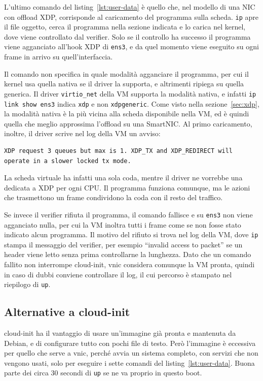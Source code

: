 L'ultimo comando del listing~\ref{lst:user-data} è quello che, nel modello di una NIC con offload XDP, corrisponde al caricamento del programma sulla scheda. \texttt{ip} apre il file oggetto, cerca il programma nella sezione indicata e lo carica nel kernel, dove viene controllato dal verifier. Solo se il controllo ha successo il programma viene agganciato all'hook XDP di \texttt{ens3}, e da quel momento viene eseguito su ogni frame in arrivo su quell'interfaccia.

Il comando non specifica in quale modalità agganciare il programma, per cui il kernel usa quella nativa se il driver la supporta, e altrimenti ripiega su quella generica. Il driver \texttt{virtio\_net} della VM supporta la modalità nativa, e infatti \texttt{ip link show ens3} indica \texttt{xdp} e non \texttt{xdpgeneric}. Come visto nella sezione~\ref{sec:xdp}, la modalità nativa è la più vicina alla scheda disponibile nella VM, ed è quindi quella che meglio approssima l'offload su una SmartNIC. Al primo caricamento, inoltre, il driver scrive nel log della VM un avviso:
\begin{lstlisting}[numbers=none, basicstyle=\ttfamily\scriptsize]
XDP request 3 queues but max is 1. XDP_TX and XDP_REDIRECT will operate in a slower locked tx mode.
\end{lstlisting}
La scheda virtuale ha infatti una sola coda, mentre il driver ne vorrebbe una dedicata a XDP per ogni CPU. Il programma funziona comunque, ma le azioni che trasmettono un frame condividono la coda con il resto del traffico.

Se invece il verifier rifiuta il programma, il comando fallisce e su \texttt{ens3} non viene agganciato nulla, per cui la VM inoltra tutti i frame come se non fosse stato indicato alcun programma. Il motivo del rifiuto si trova nel log della VM, dove \texttt{ip} stampa il messaggio del verifier, per esempio ``invalid access to packet'' se un header viene letto senza prima controllarne la lunghezza.
Dato che un comando fallito non interrompe cloud-init, vnic considera comunque la VM pronta, quindi in caso di dubbi conviene controllare il log, il cui percorso è stampato nel riepilogo di \texttt{up}.

\subsection{Alternative a cloud-init}

cloud-init ha il vantaggio di usare un'immagine già pronta e mantenuta da Debian, e di configurare tutto con pochi file di testo. Però l'immagine è eccessiva per quello che serve a vnic, perché avvia un sistema completo, con servizi che non vengono usati, solo per eseguire i sette comandi del listing~\ref{lst:user-data}. Buona parte dei circa 30 secondi di \texttt{up} se ne va proprio in questo boot.

